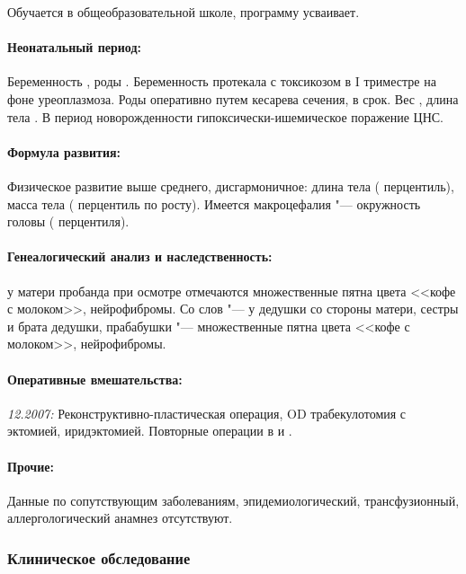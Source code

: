\documentclass[a4paper,14pt]{extarticle}
\newcommand{\kilogramm}{кг}
\newcommand{\gramm}{г}
\newcommand{\cm}{см}
\newcommand{\pdate}[1]{\emph{#1:} }
\begin{document}
Обучается в общеобразовательной школе, программу усваивает.

\paragraph{Неонатальный период:} Беременность , роды . Беременность протекала с токсикозом в I триместре на фоне уреоплазмоза. Роды оперативно путем кесарева сечения, в срок. Вес \numprint[\gramm]{4040}, длина тела \numprint[\cm]{53}. В период новорожденности гипоксически\hyp{}ишемическое поражение ЦНС.

\paragraph{Формула развития:} Физическое развитие выше среднего, дисгармоничное: длина тела \numprint[\cm]{154} ( перцентиль), масса тела \numprint[\kilogramm]{54} ( перцентиль по росту). Имеется макроцефалия "--- окружность головы \numprint[\cm]{59} ( перцентиля). 

\paragraph{Генеалогический анализ и наследственность:} у матери пробанда при осмотре отмечаются множественные пятна цвета <<кофе с молоком>>, нейрофибромы. Со слов "--- у дедушки со стороны матери, сестры и брата дедушки, прабабушки "--- множественные пятна цвета <<кофе с молоком>>, нейрофибромы.

\paragraph{Оперативные вмешательства:} \pdate{12.2007} Реконструктивно-пластическая операция, OD трабекулотомия с эктомией, иридэктомией. Повторные операции в  и .

\paragraph{Прочие:} Данные по сопутствующим заболеваниям, эпидемиологический, трансфузионный, аллергологический анамнез отсутствуют.

\subsubsection*{Клиническое обследование}
\end{document}
